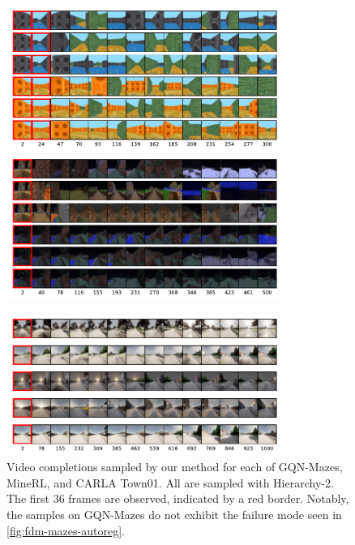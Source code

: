 \begin{figure}[b]
    \centering
    \includegraphics[width=0.8\textwidth]{figs/fdm/mazes-cond.pdf}
    \includegraphics[width=0.8\textwidth]{figs/fdm/minerl-cond.pdf}

    \includegraphics[width=0.8\textwidth]{figs/fdm/carla-cond.pdf}
    \caption{Video completions sampled by our method for each of GQN-Mazes, MineRL, and CARLA Town01. All are sampled with Hierarchy-2. The first 36 frames are observed, indicated by a red border. Notably, the samples on GQN-Mazes do not exhibit the failure mode seen in \cref{fig:fdm-mazes-autoreg}.}
    \label{fig:fdm-all-cond}
\end{figure}

